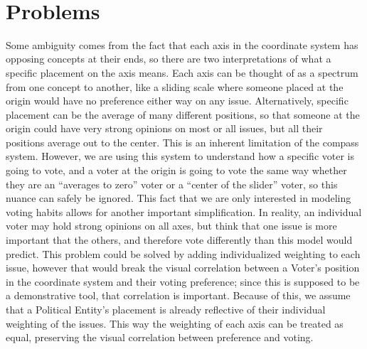 \documentclass[12pt]{article}
\begin{document}
\\


\section{Problems}

\qquad Some ambiguity comes from the fact that each axis in the coordinate system has opposing concepts at their ends, so there are two interpretations of what a specific placement on the axis means. Each axis can be thought of as a spectrum from one concept to another, like a sliding scale where someone placed at the origin would have no preference either way on any issue. Alternatively, specific placement can be the average of many different positions, so that someone at the origin could have very strong opinions on most or all issues, but all their positions average out to the center. This is an inherent limitation of the compass system. However, we are using this system to understand how a specific voter is going to vote, and a voter at the origin is going to vote the same way whether they are an ``averages to zero'' voter or a ``center of the slider'' voter, so this nuance can safely be ignored. This fact that we are only interested in modeling voting habits allows for another important simplification. In reality, an individual voter may hold strong opinions on all axes, but think that one issue is more important that the others, and therefore vote differently than this model would predict. This problem could be solved by adding individualized weighting to each issue, however that would break the visual correlation between a Voter's position in the coordinate system and their voting preference; since this is supposed to be a demonstrative tool, that correlation is important. Because of this, we assume that a Political Entity's placement is already reflective of their individual weighting of the issues. This way the weighting of each axis can be treated as equal, preserving the visual correlation between preference and voting. \\

\end{document}
